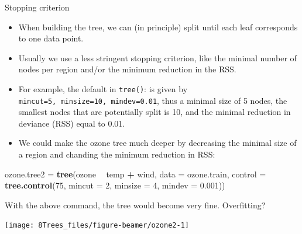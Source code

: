 \documentclass[10pt,ignorenonframetext,]{beamer}
\newenvironment{Shaded}{\begin{snugshade}}{\end{snugshade}}
\newcommand{\KeywordTok}[1]{\textcolor[rgb]{0.13,0.29,0.53}{\textbf{#1}}}
\newcommand{\DataTypeTok}[1]{\textcolor[rgb]{0.13,0.29,0.53}{#1}}
\newcommand{\DecValTok}[1]{\textcolor[rgb]{0.00,0.00,0.81}{#1}}
\newcommand{\FloatTok}[1]{\textcolor[rgb]{0.00,0.00,0.81}{#1}}
\newcommand{\StringTok}[1]{\textcolor[rgb]{0.31,0.60,0.02}{#1}}
\newcommand{\OperatorTok}[1]{\textcolor[rgb]{0.81,0.36,0.00}{\textbf{#1}}}
\newcommand{\NormalTok}[1]{#1}
\begin{document}
\begin{frame}[fragile]

\begin{block}{Stopping criterion}

\vspace{2mm}

\begin{itemize}
\item
  When building the tree, we can (in principle) split until each leaf
  corresponds to one data point.
\item
  Usually we use a less stringent stopping criterion, like the minimal
  number of nodes per region and/or the minimum reduction in the RSS.
\item
  For example, the default in \texttt{tree()}: is given by
  \texttt{mincut=5,\ minsize=10,\ mindev=0.01}, thus a minimal size of 5
  nodes, the smallest nodes that are potentially split is 10, and the
  minimal reduction in deviance (RSS) equal to 0.01.
\item
  We could make the ozone tree much deeper by decreasing the minimal
  size of a region and chanding the minimum reduction in RSS:
\end{itemize}

\scriptsize

\begin{Shaded}
\begin{Highlighting}[]
\NormalTok{ozone.tree2 =}\StringTok{ }\KeywordTok{tree}\NormalTok{(ozone }\OperatorTok{~}\StringTok{ }\NormalTok{temp }\OperatorTok{+}\StringTok{ }\NormalTok{wind, }\DataTypeTok{data =}\NormalTok{ ozone.train, }\DataTypeTok{control =} \KeywordTok{tree.control}\NormalTok{(}\DecValTok{75}\NormalTok{, }
    \DataTypeTok{mincut =} \DecValTok{2}\NormalTok{, }\DataTypeTok{minsize =} \DecValTok{4}\NormalTok{, }\DataTypeTok{mindev =} \FloatTok{0.001}\NormalTok{))}
\end{Highlighting}
\end{Shaded}

\end{block}

\end{frame}

\begin{frame}

With the above command, the tree would become very fine. Overfitting?

\begin{center}\texttt{[image: 8Trees\_files/figure-beamer/ozone2-1]} \end{center}

\end{frame}
\end{document}
